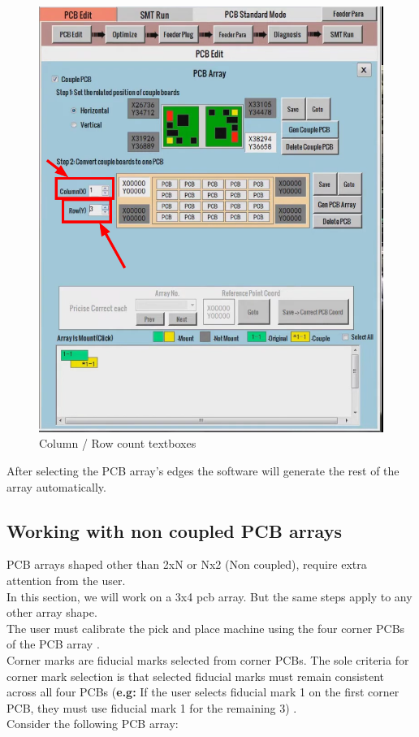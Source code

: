 \documentclass[a4paper,10pt]{report}
\begin{document}
\begin{figure}[!htb]
 \centering
 \includegraphics[width=1\textwidth]{scrot10.png}
 \caption{Column / Row count textboxes}
\end{figure}
After selecting the PCB array's edges the software will generate the rest of the array automatically.
\newpage
\subsection{Working with non coupled PCB arrays}
PCB arrays shaped other than 2xN or Nx2 (Non coupled), require extra attention from the user.\\

In this section, we will work on a 3x4 pcb array. But the same steps apply to any other array shape.\\
The user must calibrate the pick and place machine using the four corner PCBs of the PCB array .\\ Corner marks are fiducial marks selected from
corner PCBs.
The sole criteria for corner mark selection is that selected fiducial marks must remain consistent across all four PCBs (\textbf{e.g:} If the user selects fiducial mark 1 on the first corner PCB, they must use fiducial mark 1 for the remaining 3) .\\
Consider the following PCB array:
\end{document}
